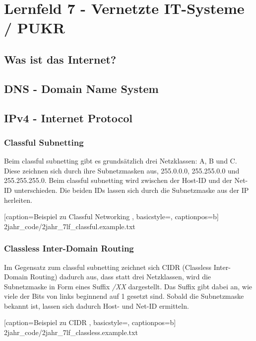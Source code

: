 \section{Lernfeld 7 - Vernetzte IT-Systeme / PUKR} %

\subsection{Was ist das Internet?}


\subsection{DNS - Domain Name System}


\subsection{IPv4 - Internet Protocol}

\subsubsection{Classful Subnetting}

Beim classful subnetting gibt es grundsätzlich drei Netzklassen: A, B und C. Diese zeichnen sich durch ihre Subnetzmasken aus, 255.0.0.0, 255.255.0.0 und 255.255.255.0. Beim classful subnetting wird zwischen der Host-ID und der Net-ID unterschieden. Die beiden IDs lassen sich durch die Subnetzmaske aus der IP herleiten.


	[caption={Beispiel zu Classful Networking}
	\label{lst:7lf_classful.example},
	basicstyle=\small,
	captionpos=b]
	{2jahr_code/2jahr_7lf_classful.example.txt}

\subsubsection{Classless Inter-Domain Routing}

Im Gegensatz zum classful subnetting zeichnet sich CIDR (Classless Inter-Domain Routing) dadurch aus, dass statt drei Netzklassen, wird die Subnetzmaske in Form eines Suffix {\it /XX} dargestellt. Das Suffix gibt dabei an, wie viele der Bits von links beginnend auf 1 gesetzt sind. Sobald die Subnetzmaske bekannt ist, lassen sich dadurch Host- und Net-ID ermitteln.


	[caption={Beispiel zu CIDR}
	\label{lst:7lf_classless.example},
	basicstyle=\small,
	captionpos=b]
	{2jahr_code/2jahr_7lf_classless.example.txt}
	
